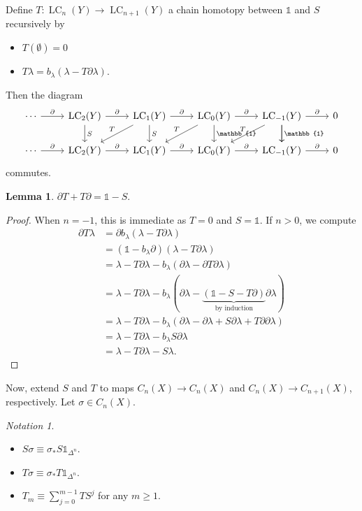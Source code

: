 \documentclass[10pt,letterpaper,cm]{nupset}
\theoremstyle{definition}
\theoremstyle{theorem}
\newtheorem{lemma}[definition]{Lemma}
\theoremstyle{remark}
\newtheorem*{notation}{Notation}
\newcommand{\1}{\mathbb{1}}
\newcommand{\0}{\vec 0}
\DeclareMathOperator{\lc}{\mathrm{LC}}
\begin{document}
Define $T: \lc_n(Y) \to \lc_{n+1}(Y)$ a chain homotopy between $\1$ and $S$ recursively by 
\begin{itemize}
\item $T(\emptyset) =0$
\item $T\lambda  = b_{\lambda}(\lambda  - T\partial{\lambda})$.
\end{itemize}
Then the diagram
\[
\begin{tikzcd}
\cdots \arrow[r, "\partial"] & \lc_2(Y) \arrow[r, "\partial"] \arrow[d, "S"] & \lc_1(Y) \arrow[r, "\partial"] \arrow[d, "S"] \arrow[ld, "T"'] & \lc_0(Y) \arrow[r, "\partial"] \arrow[d, "\1"] \arrow[ld, "T"'] & \lc_{-1}(Y) \arrow[r, "\partial"] \arrow[d, "\1"] \arrow[d] \arrow[ld, "T"'] & 0 \\
\cdots \arrow[r, "\partial"] & \lc_2(Y) \arrow[r, "\partial"]                & \lc_1(Y) \arrow[r, "\partial"]                                 & \lc_0(Y) \arrow[r, "\partial"]                                  & \lc_{-1}(Y) \arrow[r, "\partial"]                                            & 0
\end{tikzcd}
\] commutes.
\begin{lemma}
$\partial{T} + T\partial = \1 - S$.
\end{lemma}
\begin{proof}
When $n= -1$, this is immediate as $T=0$ and $S=\1$. If $n>0$, we compute
\begin{align*}
 \partial{T \lambda} & =  \partial{b_{\lambda}(\lambda  - T\partial{\lambda})}
 \\ & = (\1 - b_{\lambda}{\partial})(\lambda - T{\partial{\lambda}})
 \\ & = \lambda - T\partial{\lambda}- b_{\lambda}(\partial{\lambda} -\partial{T{\partial{\lambda}}})
 \\ & =  \lambda - T\partial{\lambda}- b_{\lambda}(\partial{\lambda} -\underbrace{(\1 -S - T{\partial})}_{\text{by induction}}{\partial{\lambda}})
 \\ & = \lambda - T\partial{\lambda}- b_{\lambda}(\partial{\lambda} - \partial{\lambda} +S{\partial{\lambda}} +T{\partial{\partial}}{\lambda})
 \\ & = \lambda  - T\partial{\lambda}  -b_{\lambda}{S{\partial{\lambda}}}
 \\ & = \lambda  - T\partial{\lambda} -S{\lambda}.
\end{align*}
\end{proof}


\medskip

Now, extend $S$ and $T$ to maps $C_n(X) \to C_n(X)$ and $C_n(X) \to C_{n+1}(X)$, respectively. Let $\sigma \in C_n(X)$.
\begin{notation} $ $
\begin{itemize}
\item $S{\sigma} \equiv \sigma_{\ast}{S{\1_{\Delta^n}}}$.
\item  $T{\sigma} \equiv \sigma_{\ast}{T{\1_{\Delta^n}}}.$
\item $T_m \equiv \sum_{j=0}^{m-1} TS^j $ for any $m\geq 1$.
\end{itemize}
\end{notation}
\end{document}
